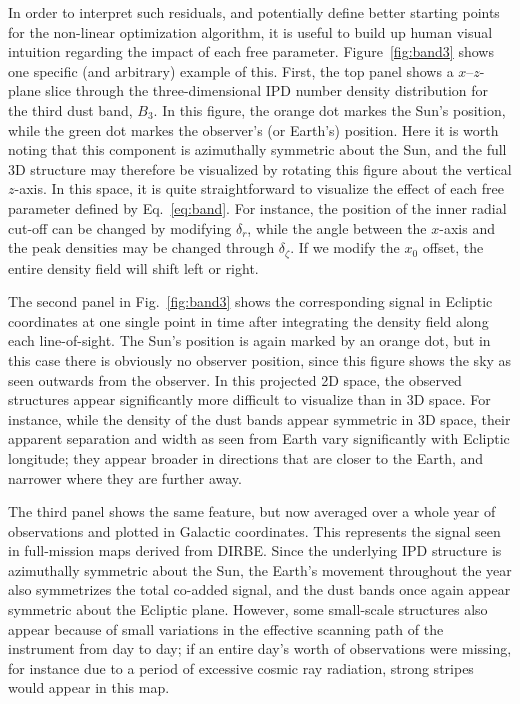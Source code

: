 \documentclass[twocolumn]{aa}
\begin{document}
In order to interpret such residuals, and potentially define better
starting points for the non-linear optimization algorithm, it is
useful to build up human visual intuition regarding the impact of each
free parameter. Figure~\ref{fig:band3} shows one specific (and
arbitrary) example of this. First, the top panel shows a
$x$--$z$-plane slice through the three-dimensional IPD number density
distribution for the third dust band, $B_3$. In this figure, the
orange dot markes the Sun's position, while the green dot markes the
observer's (or Earth's) position. Here it is worth noting that this
component is azimuthally symmetric about the Sun, and the full 3D
structure may therefore be visualized by rotating this figure about
the vertical $z$-axis. In this space, it is quite straightforward to
visualize the effect of each free parameter defined by
Eq.~\eqref{eq:band}. For instance, the position of the inner radial
cut-off can be changed by modifying $\delta_{r}$, while the angle
between the $x$-axis and the peak densities may be changed through
$\delta_{\zeta}$. If we modify the $x_0$ offset, the entire density
field will shift left or right.

The second panel in Fig.~\ref{fig:band3} shows the corresponding
signal in Ecliptic coordinates at one single point in time after
integrating the density field along each line-of-sight. The Sun's
position is again marked by an orange dot, but in this case there is
obviously no observer position, since this figure shows the sky as
seen outwards from the observer. In this projected 2D space, the
observed structures appear significantly more difficult to visualize
than in 3D space. For instance, while the density of the dust bands
appear symmetric in 3D space, their apparent separation and width as
seen from Earth vary significantly with Ecliptic longitude; they
appear broader in directions that are closer to the Earth, and
narrower where they are further away.

The third panel shows the same feature, but now averaged over a whole
year of observations and plotted in Galactic coordinates. This
represents the signal seen in full-mission maps derived from
DIRBE. Since the underlying IPD structure is azimuthally symmetric
about the Sun, the Earth's movement throughout the year also
symmetrizes the total co-added signal, and the dust bands once again
appear symmetric about the Ecliptic plane. However, some small-scale
structures also appear because of small variations in the effective
scanning path of the instrument from day to day; if an entire day's
worth of observations were missing, for instance due to a period of
excessive cosmic ray radiation, strong stripes would appear in this
map.
\end{document}
